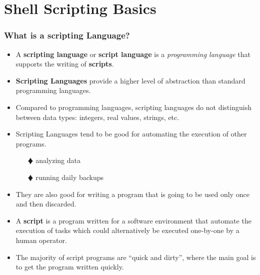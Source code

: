 \documentclass[10pt,t]{beamer}
\begin{document}
\section{Shell Scripting Basics}
\begin{frame}
  \frametitle{What is a scripting Language?}
  \begin{exampleblock}{}%
    \begin{itemize}
      \item A \textbf{scripting language} or \textbf{script language} is a \emph{programming language} that supports the writing of \textbf{scripts}.
      \item \textbf{Scripting Languages} provide a higher level of abstraction than standard programming languages.
      \item Compared to programming languages, scripting languages do not distinguish between data types: integers, real values, strings, etc.
      \item Scripting Languages tend to be good for automating the execution of other programs.
      \begin{enumerate}
          \item[$\vardiamond$] analyzing data
          \item[$\vardiamond$] running daily backups
      \end{enumerate}
      \item They are also good for writing a program that is going to be used only once and then discarded.
      \item A \textbf{script} is a program written for a software environment that automate the execution of tasks which could alternatively be executed one-by-one by a human operator.
      \item The majority of script programs are ``quick and dirty'', where the main goal is to get the program written quickly.
    \end{itemize}
  \end{exampleblock}
\end{frame}
\end{document}
